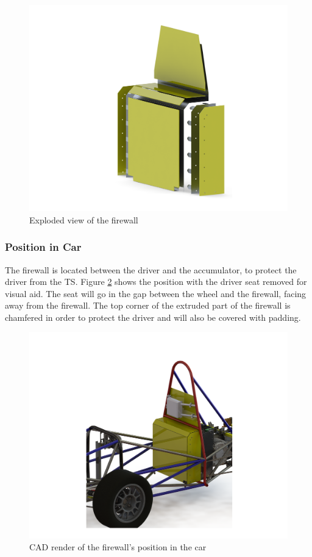 \documentclass{article}
\begin{document}
            \begin{figure}[H]
                \centering
                \includegraphics[width = 0.6 \textwidth]{ExplodedView}
                \caption{Exploded view of the firewall}
                \label{explodedfirewall}
            \end{figure}

        \subsubsection{Position in Car}
        
            The firewall is located between the driver and the accumulator, to protect the driver from the TS. Figure \ref{firewallposition} shows the position with the driver seat removed for visual aid. The seat will go in the gap between the wheel and the firewall, facing away from the firewall. The top corner of the extruded part of the firewall is chamfered in order to protect the driver and will also be covered with padding.
            
            \begin{figure}[H]
                \centering
                \includegraphics[width = 0.8 \textwidth]{FirewallFullCarView}
                \caption{CAD render of the firewall's position in the car}
                \label{firewallposition}
            \end{figure}
            
\end{document}
